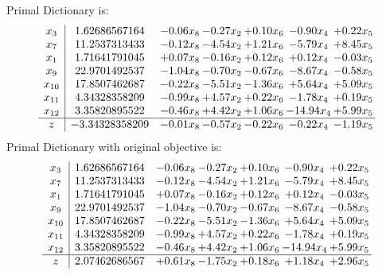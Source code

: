 \documentclass[8pt]{article}
\begin{document}
Primal Dictionary is:
\[\begin{array}{c| c c@{\hskip 2pt} c@{\hskip 2pt} c@{\hskip 2pt} c@{\hskip 2pt} c@{\hskip 2pt} }
 x_{3}   &  1.62686567164 & -0.06 x_{8} & -0.27 x_{2} & +  0.10 x_{6} & -0.90 x_{4} & +  0.22 x_{5}\\
 x_{7}   &  11.2537313433 & -0.12 x_{8} & -4.54 x_{2} & +  1.21 x_{6} & -5.79 x_{4} & +  8.45 x_{5}\\
 x_{1}   &  1.71641791045 & +  0.07 x_{8} & -0.16 x_{2} & +  0.12 x_{6} & +  0.12 x_{4} & -0.03 x_{5}\\
 x_{9}   &  22.9701492537 & -1.04 x_{8} & -0.70 x_{2} & -0.67 x_{6} & -8.67 x_{4} & -0.58 x_{5}\\
 x_{10}   &  17.8507462687 & -0.22 x_{8} & -5.51 x_{2} & -1.36 x_{6} & +  5.64 x_{4} & +  5.09 x_{5}\\
 x_{11}   &  4.34328358209 & -0.99 x_{8} & +  4.57 x_{2} & +  0.22 x_{6} & -1.78 x_{4} & +  0.19 x_{5}\\
 x_{12}   &  3.35820895522 & -0.46 x_{8} & +  4.42 x_{2} & +  1.06 x_{6} & -14.94 x_{4} & +  5.99 x_{5}\\
\hline
z    &  -3.34328358209 & -0.01 x_{8} & -0.57 x_{2} & -0.22 x_{6} & -0.22 x_{4} & -1.19 x_{5}\\
\end{array}\]
Primal Dictionary with original objective is:
\[\begin{array}{c| c c@{\hskip 2pt} c@{\hskip 2pt} c@{\hskip 2pt} c@{\hskip 2pt} c@{\hskip 2pt} }
 x_{3}   &  1.62686567164 & -0.06 x_{8} & -0.27 x_{2} & +  0.10 x_{6} & -0.90 x_{4} & +  0.22 x_{5}\\
 x_{7}   &  11.2537313433 & -0.12 x_{8} & -4.54 x_{2} & +  1.21 x_{6} & -5.79 x_{4} & +  8.45 x_{5}\\
 x_{1}   &  1.71641791045 & +  0.07 x_{8} & -0.16 x_{2} & +  0.12 x_{6} & +  0.12 x_{4} & -0.03 x_{5}\\
 x_{9}   &  22.9701492537 & -1.04 x_{8} & -0.70 x_{2} & -0.67 x_{6} & -8.67 x_{4} & -0.58 x_{5}\\
 x_{10}   &  17.8507462687 & -0.22 x_{8} & -5.51 x_{2} & -1.36 x_{6} & +  5.64 x_{4} & +  5.09 x_{5}\\
 x_{11}   &  4.34328358209 & -0.99 x_{8} & +  4.57 x_{2} & +  0.22 x_{6} & -1.78 x_{4} & +  0.19 x_{5}\\
 x_{12}   &  3.35820895522 & -0.46 x_{8} & +  4.42 x_{2} & +  1.06 x_{6} & -14.94 x_{4} & +  5.99 x_{5}\\
\hline
z    &  2.07462686567 & +  0.61 x_{8} & -1.75 x_{2} & +  0.18 x_{6} & +  1.18 x_{4} & +  2.96 x_{5}\\
\end{array}\]
\end{document}
